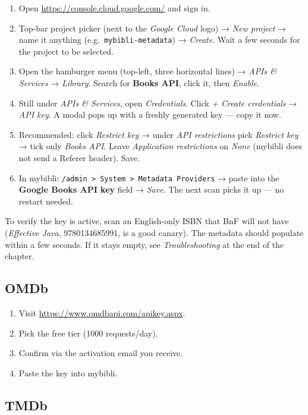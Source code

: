 \begin{enumerate}
  \item Open \url{https://console.cloud.google.com/} and sign in.
  \item Top-bar project picker (next to the
        \emph{Google Cloud} logo) → \emph{New project} → name it
        anything (e.g.\ \texttt{mybibli-metadata}) → \emph{Create}.
        Wait a few seconds for the project to be selected.
  \item Open the hamburger menu (top-left, three horizontal
        lines) → \emph{APIs \& Services} →
        \emph{Library}. Search for \textbf{Books API}, click it,
        then \emph{Enable}.
  \item Still under \emph{APIs \& Services}, open
        \emph{Credentials}. Click \emph{+ Create credentials} →
        \emph{API key}. A modal pops up with a freshly generated
        key — copy it now.
  \item Recommended: click \emph{Restrict key} → under
        \emph{API restrictions} pick \emph{Restrict key} → tick
        only \emph{Books API}. Leave \emph{Application
        restrictions} on \emph{None} (mybibli does not send a
        Referer header). Save.
  \item In mybibli: \texttt{/admin > System > Metadata Providers}
        → paste into the \textbf{Google Books API key} field →
        \emph{Save}. The next scan picks it up — no restart needed.
\end{enumerate}

To verify the key is active, scan an English-only ISBN that BnF
will not have (\emph{Effective Java}, 9780134685991, is a good
canary). The metadata should populate within a few seconds. If it
stays empty, see \emph{Troubleshooting} at the end of the chapter.

\subsection*{OMDb}

\begin{enumerate}
  \item Visit \url{https://www.omdbapi.com/apikey.aspx}.
  \item Pick the free tier (1000 requests/day).
  \item Confirm via the activation email you receive.
  \item Paste the key into mybibli.
\end{enumerate}

\subsection*{TMDb}


